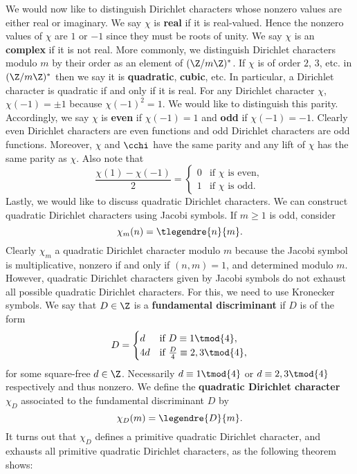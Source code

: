     We would now like to distinguish Dirichlet characters whose nonzero values are either real or imaginary. We say $\chi$ is \textbf{real} if it is real-valued. Hence the nonzero values of $\chi$ are $1$ or $-1$ since they must be roots of unity. We say $\chi$ is an \textbf{complex} if it is not real. More commonly, we distinguish Dirichlet characters modulo $m$ by their order as an element of $(\Z/m\Z)^{\ast}$. If $\chi$ is of order $2$, $3$, etc. in $(\Z/m\Z)^{\ast}$ then we say it is \textbf{quadratic}, \textbf{cubic}, etc. In particular, a Dirichlet character is quadratic if and only if it is real. For any Dirichlet character $\chi$, $\chi(-1) = \pm 1$ because $\chi(-1)^{2} = 1$. We would like to distinguish this parity. Accordingly, we say $\chi$ is \textbf{even} if $\chi(-1) = 1$ and \textbf{odd} if $\chi(-1) = -1$. Clearly even Dirichlet characters are even functions and odd Dirichlet characters are odd functions. Moreover, $\chi$ and $\cchi$ have the same parity and any lift of $\chi$ has the same parity as $\chi$. Also note that
    \[
      \frac{\chi(1)-\chi(-1)}{2} = \begin{cases} 0 & \text{if $\chi$ is even}, \\ 1 & \text{if $\chi$ is odd}. \end{cases}
    \]
    Lastly, we would like to discuss quadratic Dirichlet characters. We can construct quadratic Dirichlet characters using Jacobi symbols. If $m \ge 1$ is odd, consider
    \[
      \chi_{m}(n) = \tlegendre{n}{m}.
    \]
    Clearly $\chi_{m}$ a quadratic Dirichlet character modulo $m$ because the Jacobi symbol is multiplicative, nonzero if and only if $(n,m) = 1$, and determined modulo $m$. However, quadratic Dirichlet characters given by Jacobi symbols do not exhaust all possible quadratic Dirichlet characters. For this, we need to use Kronecker symbols. We say that $D \in \Z$ is a \textbf{fundamental discriminant} if $D$ is of the form
    \[
      D = \begin{cases} d & \text{if $D \equiv 1 \tmod{4}$}, \\ 4d & \text{if $\frac{D}{4} \equiv 2,3 \tmod{4}$}, \end{cases}
    \]
    for some square-free $d \in \Z$. Necessarily $d \equiv 1 \tmod{4}$ or $d \equiv 2,3 \tmod{4}$ respectively and thus nonzero. We define the \textbf{quadratic Dirichlet character} $\chi_{D}$ associated to the fundamental discriminant $D$ by
    \[
      \chi_{D}(m) = \legendre{D}{m}.
    \]
    It turns out that $\chi_{D}$ defines a primitive quadratic Dirichlet character, and exhausts all primitive quadratic Dirichlet characters, as the following theorem shows:

